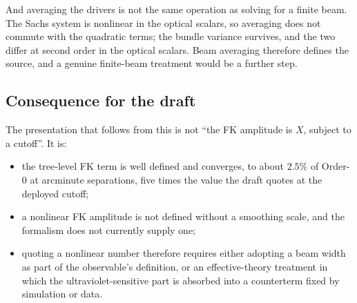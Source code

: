 And averaging the drivers is not the same operation as solving for a finite
beam. The Sachs system is nonlinear in the optical scalars, so averaging
does not commute with the quadratic terms; the bundle variance survives,
and the two differ at second order in the optical scalars. Beam averaging
therefore defines the source, and a genuine finite-beam treatment would be
a further step.

\subsection{Consequence for the draft}

The presentation that follows from this is not ``the FK amplitude is
$X$, subject to a cutoff''. It is:

\begin{itemize}
\item the tree-level FK term is well defined and converges, to about
$2.5\%$ of Order-0 at arcminute separations, five times the value the draft
quotes at the deployed cutoff;
\item a nonlinear FK amplitude is not defined without a smoothing scale,
and the formalism does not currently supply one;
\item quoting a nonlinear number therefore requires either adopting a beam
width as part of the observable's definition, or an effective-theory
treatment in which the ultraviolet-sensitive part is absorbed into a
counterterm fixed by simulation or data.
\end{itemize}
